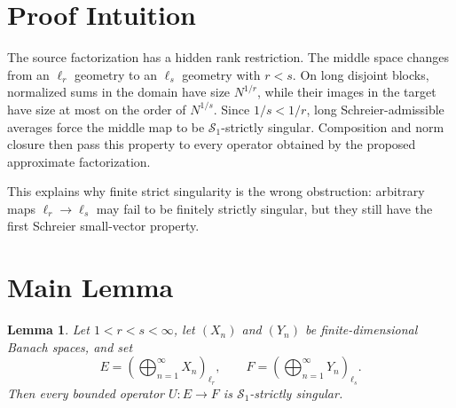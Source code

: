\documentclass[11pt]{article}
\newtheorem{lemma}{Lemma}
\newcommand{\oplusell}[2]{\left(\bigoplus_{n=1}^{\infty} #1_n\right)_{\ell_{#2}}}
\begin{document}
\section*{Proof Intuition}

The source factorization has a hidden rank restriction.  The middle space
changes from an $\ell_r$ geometry to an $\ell_s$ geometry with $r<s$.  On
long disjoint blocks, normalized sums in the domain have size $N^{1/r}$,
while their images in the target have size at most on the order of
$N^{1/s}$.  Since $1/s<1/r$, long Schreier-admissible averages force the
middle map to be $\mathcal S_1$-strictly singular.  Composition and norm
closure then pass this property to every operator obtained by the proposed
approximate factorization.

This explains why finite strict singularity is the wrong obstruction:
arbitrary maps $\ell_r\to\ell_s$ may fail to be finitely strictly singular,
but they still have the first Schreier small-vector property.

\section*{Main Lemma}

\begin{lemma}\label{lem:fdd-middle}
Let $1<r<s<\infty$, let $(X_n)$ and $(Y_n)$ be finite-dimensional Banach
spaces, and set
\[
  E=\oplusell{X}{r},\qquad F=\oplusell{Y}{s}.
\]
Then every bounded operator $U:E\to F$ is $\mathcal S_1$-strictly singular.
\end{lemma}
\end{document}
